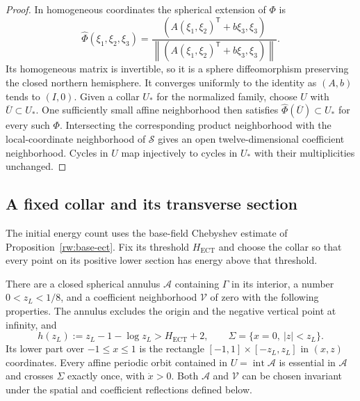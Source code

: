 \begin{proof}
In homogeneous coordinates the spherical extension of $\Phi$ is
\[
 \widehat\Phi(\xi_1,\xi_2,\xi_3)
 =\frac{(A(\xi_1,\xi_2)^{\mathsf T}+b\xi_3,\xi_3)}
 {\left\|(A(\xi_1,\xi_2)^{\mathsf T}+b\xi_3,\xi_3)\right\|}.
\]
Its homogeneous matrix is invertible, so it is a sphere
diffeomorphism preserving the closed northern hemisphere.  It converges
uniformly to the identity as $(A,b)$ tends to $(I,0)$.  Given a collar
$U_*$ for the normalized family, choose $U$ with
$\overline U\subset U_*$.  One sufficiently small affine neighborhood
then satisfies $\widehat\Phi(\overline U)\subset U_*$ for every such
$\Phi$.  Intersecting the corresponding product neighborhood with the
local-coordinate neighborhood of $\mathcal S$ gives an open
twelve-dimensional coefficient neighborhood.  Cycles in $U$ map
injectively to cycles in $U_*$ with their multiplicities unchanged.
\end{proof}

\subsection{A fixed collar and its transverse section}

The initial energy count uses the base-field Chebyshev estimate of
Proposition~\ref{rw:base-ect}.  Fix its threshold
$H_{\mathrm{ECT}}$ and choose the collar so that every point on its
positive lower section has energy above that threshold.

\begin{proposition}\label{rw:collar}
There are a closed spherical annulus $\mathcal A$ containing $\Gamma$
in its interior, a number $0<z_L<1/8$, and a coefficient neighborhood
$\mathcal V$ of zero with the following properties.  The annulus
excludes the origin and the negative vertical point at infinity, and
\begin{equation}\label{rw:geometry:section}
 h(z_L):=z_L-1-\log z_L>H_{\mathrm{ECT}}+2,
 \qquad \Sigma=\{x=0,\ |z|<z_L\}.
\end{equation}
Its lower part over $-1\le x\le1$ is the rectangle
$[-1,1]\times[-z_L,z_L]$ in $(x,z)$ coordinates.
Every affine periodic orbit contained in $U=\operatorname{int}\mathcal A$
is essential in $\mathcal A$ and crosses $\Sigma$ exactly once, with
$\dot x>0$.  Both $\mathcal A$ and $\mathcal V$ can be chosen invariant
under the spatial and coefficient reflections defined below.
\end{proposition}

